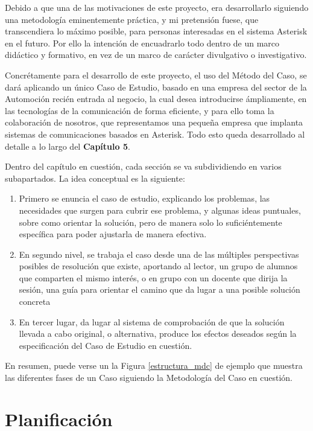 Debido a que una de las motivaciones de este proyecto, era desarrollarlo siguiendo una metodología eminentemente práctica, y mi pretensión fuese, que transcendiera lo máximo posible, para personas interesadas en el sistema Asterisk en el futuro. Por ello la intención de encuadrarlo todo dentro de un marco didáctico y formativo, en vez de un marco de carácter divulgativo o investigativo.

Concrétamente para el desarrollo de este proyecto, el uso del Método del Caso, se dará aplicando un único Caso de Estudio, basado en una empresa del sector de la Automoción recién entrada al negocio, la cual desea introducirse ámpliamente, en las tecnologías de la comunicación de forma eficiente, y para ello toma la colaboración de nosotros, que representamos una pequeña empresa que implanta sistemas de comunicaciones basados en Asterisk. Todo esto queda desarrollado al detalle a lo largo del \textbf{Capítulo 5}.

Dentro del capítulo en cuestión, cada sección se va subdividiendo en varios subapartados. La idea conceptual es la siguiente:


\begin{enumerate}
	\item Primero se enuncia el caso de estudio, explicando los problemas, las necesidades que surgen para cubrir ese problema, y algunas ideas puntuales, sobre como orientar la solución, pero de manera solo lo suficiéntemente específica para poder ajustarla de manera efectiva.
	\item En segundo nivel, se trabaja el caso desde una de las múltiples perspectivas posibles de resolución que existe, aportando al lector, un grupo de alumnos que comparten el mismo interés, o en grupo con un docente que dirija la sesión, una guía para orientar el camino que da lugar a una posible solución concreta
	\item En tercer lugar, da lugar al sistema de comprobación de que la solución llevada a cabo original, o alternativa, produce los efectos deseados según la especificación del Caso de Estudio en cuestión.
\end{enumerate}

En resumen, puede verse un la Figura \ref{estructura_mdc} de ejemplo que muestra las diferentes fases de un Caso siguiendo la Metodología del Caso en cuestión.


\section{Planificación}

